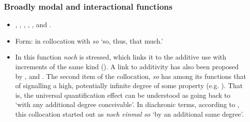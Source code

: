 \subsubsection{Broadly modal and interactional functions}
\largerpage
{}\label{appendixGermanNochSo}
\begin{itemize}
	\item \textcite[s.v. \textit{noch}]{DWDS}, \textcite[s.v. \textit{noch}]{Duden}, \textcite{HaspelmathKoenig1998}, \textcite[186–187]{Helbig1994}, \textcite[174]{KoenigEtAl1993}, \textcite[634–636]{MetrichFaucher2009} and \textcite{Shetter1966}.
	\item Form: in collocation with \textit{so} \lq so, thus, that much.'
	\item In this function \textit{noch} is stressed, which links it to the additive use with increments of the same kind (). A link to additivity has also been proposed by \textcite{HaspelmathKoenig1998}, \textcite{MetrichFaucher2009} and \textcite{Shetter1966}. The second item of the collocation, \textit{so} has among its functions that of signalling a high, potentially infinite degree of some property (e.g. \cite[s.v. \textit{so}]{DWDS}). That is, the universal quantification effect can be understood as going back to \lq with any additional degree conceivable\rq{}. In diachronic terms, according to \textcite{DWDS}, this collocation started out as \textit{noch einmal so} \lq by an additional same degree\rq{}.

\end{itemize}
